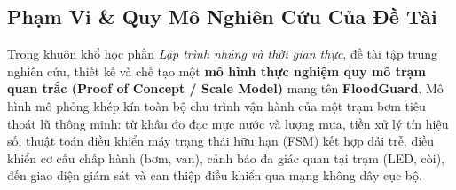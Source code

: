 \subsection{Phạm Vi \& Quy Mô Nghiên Cứu Của Đề Tài}
Trong khuôn khổ học phần \textit{Lập trình nhúng và thời gian thực}, đề tài tập trung nghiên cứu, thiết kế và chế tạo một \textbf{mô hình thực nghiệm quy mô trạm quan trắc (Proof of Concept / Scale Model)} mang tên \textbf{FloodGuard}. Mô hình mô phỏng khép kín toàn bộ chu trình vận hành của một trạm bơm tiêu thoát lũ thông minh: từ khâu đo đạc mực nước và lượng mưa, tiền xử lý tín hiệu số, thuật toán điều khiển máy trạng thái hữu hạn (FSM) kết hợp dải trễ, điều khiển cơ cấu chấp hành (bơm, van), cảnh báo đa giác quan tại trạm (LED, còi), đến giao diện giám sát và can thiệp điều khiển qua mạng không dây cục bộ.

